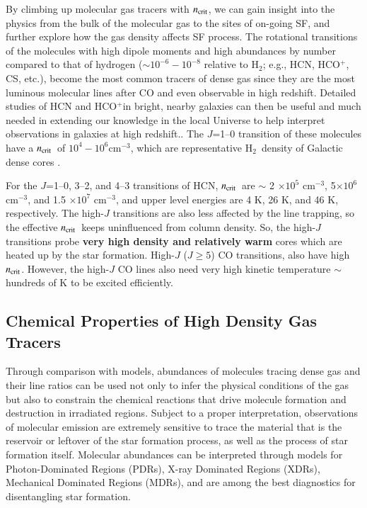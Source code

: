 \documentclass[legal,11pt]{article}
\def\cmt   {cm$^{-3}$\,}
\def\,{\thinspace}
\def\Htwo{H$_2$}
\def\ncrit{$n_{\rm crit}$}
\def\HCOP       {HCO$^{+}$}
\def\Htwo       {H$_2$}
\begin{document}
By climbing up molecular gas tracers with \ncrit, we can gain insight into the
physics from the bulk of the molecular gas to the sites of on-going SF, and
further explore how the gas density affects SF process.  The rotational
transitions of the molecules with high dipole moments and high abundances 
by number compared to that of hydrogen
($\sim 10^{-6}-10^{-8}$ relative to \Htwo; e.g., HCN, \HCOP, CS, etc.), become
the most common tracers of dense gas since they are the most luminous molecular lines 
after CO and even observable in high redshift. Detailed studies of HCN and \HCOP in 
bright, nearby galaxies can then be useful
and much needed in extending our knowledge in the local Universe to help 
interpret observations in galaxies at
high redshift.. The $J$=1--0 transition of these
molecules have a \ncrit\  of $10^4 - 10^6$\cmt, which are representative \Htwo\
density of Galactic dense cores \citep[e.g.,][]{Plume1997,weg05}. 



For the $J$=1--0, 3--2, and 4--3 transitions of HCN,  \ncrit\ are $\sim$ 2
$\times 10^5$ \cmt, 5$\times 10^6$ \cmt, and 1.5 $\times 10^7$ \cmt, and upper
level energies are 4 K, 26 K, and 46 K, respectively. The high-$J$ transitions
are also less affected by the line trapping, so the effective \ncrit\ keeps
uninfluenced from column density. So, the high-$J$ transitions probe {\bf very
high density and relatively warm} cores which are heated up by the star
formation. High-$J$ ($J\ge 5$) CO transitions, also have high \ncrit.  However,
the high-$J$ CO lines also need very high kinetic temperature $\sim$hundreds of
K to be excited efficiently. 




\subsection{Chemical Properties of High Density Gas Tracers  }

Through comparison with models, abundances of molecules tracing dense gas and
their line ratios can be used not only to infer the physical conditions of the
gas but also to constrain the chemical reactions that drive molecule formation
and destruction in irradiated regions\citep[e.g.,][]{vandishoeck1998}. Subject
to a proper interpretation, observations of molecular emission are extremely
sensitive to trace the material that is the reservoir or leftover of the star
formation process, as well as the process of star formation itself. Molecular
abundances can be interpreted through models for Photon-Dominated Regions
(PDRs), X-ray Dominated Regions (XDRs), Mechanical Dominated Regions (MDRs),
and are among the best diagnostics for disentangling star formation.
\end{document}
